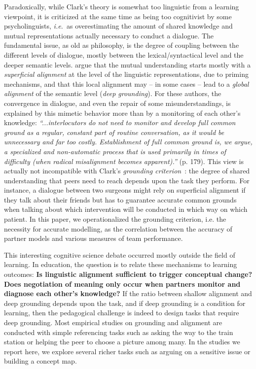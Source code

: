 \documentclass[natbib]{svjour3}
\newcommand{\ie}{{\textit{i.e.\ }}}
\begin{document}
Paradoxically, while Clark's theory is somewhat too linguistic from a learning
viewpoint, it is criticized at the same time as being too cognitivist by some
psycholinguists, \ie as overestimating the amount of shared knowledge and mutual
representations actually necessary to conduct a dialogue. The fundamental issue,
as old as philosophy, is the degree of coupling between the different levels of
dialogue, mostly between the lexical/syntactical level and the deeper semantic
levels. \citet{pickering2006alignment} argue that the mutual understanding
starts mostly with a \emph{superficial alignment} at the level of the linguistic
representations, due to priming mechanisms, and that this local alignment may --
in some cases -- lead to a \emph{global alignment} of the semantic level
(\emph{deep grounding}).  For these authors, the convergence in dialogue, and
even the repair of some misunderstandings, is explained by this mimetic behavior
more than by a monitoring of each other's knowledge: \emph{``...interlocutors do
not need to monitor and develop full common ground as a regular, constant
part of routine conversation, as it would be unnecessary and far too costly.
Establishment of full common ground is, we argue, a specialized and
non-automatic process that is used primarily in times of difficulty (when
radical misalignment becomes apparent).''} (p. 179).  This view is actually not
incompatible with Clark's \emph{grounding
criterion}~\citep{clark1989contributing}: the degree of shared understanding
that peers need to reach depends upon the task they perform. For instance, a
dialogue between two surgeons might rely on superficial alignment if they talk
about their friends but has to guarantee accurate common grounds when talking
about which intervention will be conducted in which way on which patient.  In
this paper, we operationalized the grounding criterion, i.e. the necessity for
accurate modelling, as the correlation between the accuracy of partner models
and various measures of team performance.


This interesting cognitive science debate occurred mostly outside the field of
learning. In education, the question is to relate these mechanisms to learning
outcomes: \textbf{Is linguistic alignment sufficient to trigger conceptual
change?} \textbf{Does negotiation of meaning only occur when partners monitor
and diagnose each other's knowledge?} If the ratio between shallow alignment and
deep grounding depends upon the task, and if deep grounding is a condition for
learning, then the pedagogical challenge is indeed to design tasks that require
deep grounding. Most empirical studies on grounding and alignment are conducted
with simple referencing tasks such as asking the way to the train station
or helping the peer to choose a picture among many. In the studies we report here, we
explore several richer tasks such as arguing on a sensitive issue or building a
concept map.  
\end{document}

